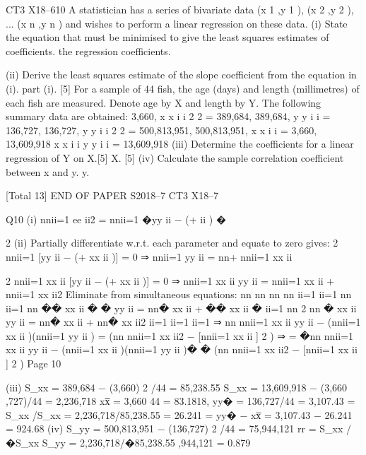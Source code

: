 \documentclass[a4paper,12pt]{article}
\begin{document}
CT3 X18–610
A statistician has a series of bivariate data {(x 1 ,y 1 ), (x 2 ,y 2 ), ... (x n ,y n )} and wishes to
perform a linear regression on these data.
(i) State the equation that must be minimised to give the least squares estimates of
coefficients.
the regression coefficients.

(ii) Derive the least squares estimate of the slope coefficient from the equation in
(i).
part (i).
[5]
For a sample of 44 fish, the age (days) and length (millimetres) of each fish are
measured. Denote age by X and length by Y. The following summary data are
obtained:
3,660, \sum x x i i 2 2 = 389,684,
389,684, \sum y y i i = 136,727,
136,727, \sum y y i i 2 2 = 500,813,951,
500,813,951,
\sum x x i i = 3,660,
13,609,918
\sum x x i i y y i i = 13,609,918
(iii) Determine the coefficients for a linear regression of Y on X.[5]
X.
[5]
(iv)
 Calculate the sample correlation coefficient between x and y.
y.

[Total 13]
END OF PAPER
S2018–7 
CT3 X18–7

Q10
(i) \sum nnii=1 ee ii2 = \sum nnii=1 �yy ii − (\alpha\alpha + \beta\betaxx ii ) �

2
(ii) Partially differentiate w.r.t. each parameter and equate to zero gives:
2 \sum nnii=1 [yy ii − (\hat{\alpha}+ \hat{\beta}xx ii )] = 0 ⇒ \sum nnii=1 yy ii = nn\hat{\alpha}+ \hat{\beta}\sum nnii=1 xx ii

2 \sum nnii=1 xx ii [yy ii − (\hat{\alpha}+ \hat{\beta}xx ii )] = 0 ⇒ \sum nnii=1 xx ii yy ii = \hat{\alpha}\sum nnii=1 xx ii + \hat{\beta}\sum nnii=1 xx ii2
Eliminate \hat{\alpha}from simultaneous equations:
nn
nn nn nn
ii=1 ii=1
nn ii=1
nn
�� xx ii � � yy ii = nn\hat{\alpha}� xx ii + \hat{\beta}�� xx ii �
ii=1
nn
2
nn � xx ii yy ii = nn\hat{\alpha}� xx ii + nn\hat{\beta}� xx ii2
ii=1
ii=1
ii=1
⇒ nn \sum nnii=1 xx ii yy ii − (\sum nnii=1 xx ii )(\sum nnii=1 yy ii ) = \hat{\beta}(nn \sum nnii=1 xx ii2 − [\sum nnii=1 xx ii ] 2 )
⇒ \hat{\beta}= �nn \sum nnii=1 xx ii yy ii − (\sum nnii=1 xx ii )(\sum nnii=1 yy ii )� � (nn \sum nnii=1 xx ii2 − [\sum nnii=1 xx ii ] 2 )
Page 10



(iii) S_{xx} = 389,684 − (3,660) 2 /44 = 85,238.55
S_{xx} = 13,609,918 − (3,660 \; \times {},727)/44 = 2,236,718
xx̅ =
3,660
44
= 83.1818, yy� = 136,727/44 = 3,107.43
\hat{\beta}= S_{xx} /S_{xx} = 2,236,718/85,238.55 = 26.241
\hat{\alpha}= yy� − \hat{\beta}xx̅ = 3,107.43 − 26.241 \; \times {} = 924.68
(iv) S_{yy} = 500,813,951 − (136,727) 2 /44 = 75,944,121
rr = S_{xx} / �S_{xx} S_{yy} = 2,236,718/�85,238.55 \; \times {},944,121 = 0.879







\end{document}
